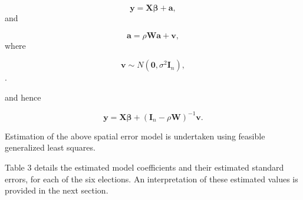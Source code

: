 \documentclass[11pt,a4paper,]{article}
\begin{document}
\[{\boldsymbol y} = {\boldsymbol X} {\boldsymbol \beta} + {\boldsymbol a},\]
and

\[{\boldsymbol a} = \rho {\boldsymbol W} {\boldsymbol a} + {\boldsymbol v},\]
where

\[{\boldsymbol v} \sim N({\boldsymbol 0}, \sigma^2 {\boldsymbol I_n}),\].

and hence

\[{\boldsymbol y} = {\boldsymbol X} {\boldsymbol \beta} + ({\boldsymbol I}_n-\rho {\boldsymbol W})^{-1}{\boldsymbol v}.\]

Estimation of the above spatial error model is undertaken using feasible generalized least squares.

Table 3 details the estimated model coefficients and their estimated standard errors, for each of the six elections. An interpretation of these estimated values is provided in the next section.
\end{document}
